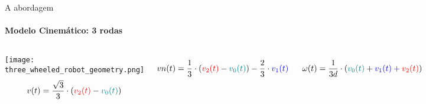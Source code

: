 \begin{frame}[t]{A abordagem}
  \transboxout[duration=0.5]
  \framesubtitle{Modelo Cinemático: 3 rodas}
  \begin{columns}
    \texttt{[image: three\_wheeled\_robot\_geometry.png]}
      \begin{equation*}
        v(t) = 
        \frac{\sqrt{3}}{3} \cdot
        \left(
          {\color[rgb]{1,0,0} v_2(t)} - 
          {\color[rgb]{0,0.5,0.5} v_0(t)}
        \right)
      \end{equation*}

      \begin{equation*}
        vn(t) =
        \frac{1}{3} \cdot
        \left(
          {\color[rgb]{1,0,0} v_2(t)} -
          {\color[rgb]{0,0.5,0.5} v_0(t)}\right) - 
          \frac{2}{3} \cdot
          {\color[rgb]{0,0,1} v_1(t)}
      \end{equation*}

      \begin{equation*}
        \omega(t) =
        \frac{1}{3d}\cdot
        \left(
          {\color[rgb]{0,0.5,0.5} v_0(t)} +
          {\color[rgb]{0,0,1} v_1(t) +
          {\color[rgb]{1,0,0} v_2(t)}}
        \right)
      \end{equation*}
  \end{columns}
\end{frame}


